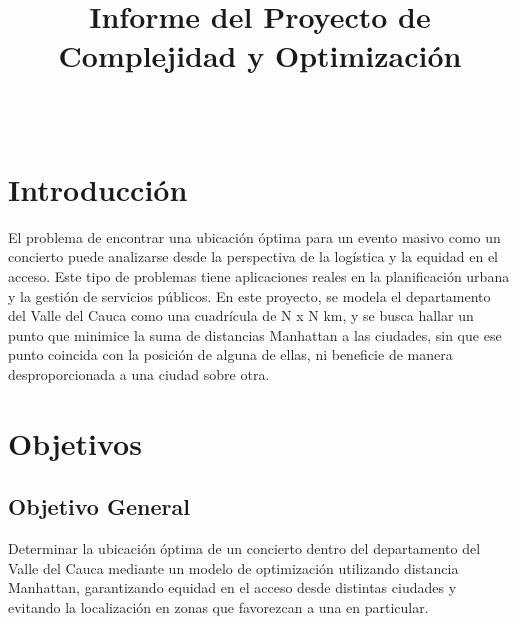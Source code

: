 \documentclass[conference]{IEEEtran}
\begin{document}
\title{Informe del Proyecto de Complejidad y Optimización\\
}

\author{
\and
{}
\\
\and
{}
}

\maketitle

\section{Introducción}
El problema de encontrar una ubicación óptima para un evento masivo como un concierto puede analizarse desde la perspectiva de la logística y la equidad en el acceso. Este tipo de problemas tiene aplicaciones reales en la planificación urbana y la gestión de servicios públicos. En este proyecto, se modela el departamento del Valle del Cauca como una cuadrícula de N x N km, y se busca hallar un punto que minimice la suma de distancias Manhattan a las ciudades, sin que ese punto coincida con la posición de alguna de ellas, ni beneficie de manera desproporcionada a una ciudad sobre otra.

\section{Objetivos}

\subsection{Objetivo General}

Determinar la ubicación óptima de un concierto dentro del departamento
del Valle del Cauca mediante un modelo de optimización utilizando
distancia Manhattan, garantizando equidad en el acceso desde distintas
ciudades y evitando la localización en zonas que favorezcan a una en
particular.
\end{document}
